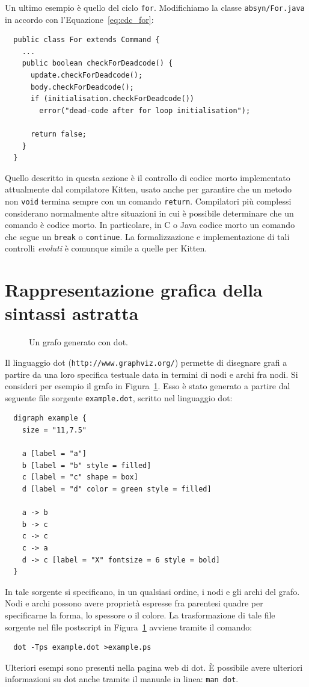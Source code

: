 Un ultimo esempio \`e quello del ciclo \texttt{for}.
Modifichiamo la classe \texttt{absyn/For.java} in accordo
con l'Equazione~\eqref{eq:cdc_for}:
%
\begin{verbatim}
  public class For extends Command {
    ...
    public boolean checkForDeadcode() {
      update.checkForDeadcode();
      body.checkForDeadcode();
      if (initialisation.checkForDeadcode())
        error("dead-code after for loop initialisation");

      return false;
    }
  }
\end{verbatim}
%

Quello descritto in questa sezione \`e il controllo di codice morto
implementato attualmente dal compilatore Kitten, usato anche per garantire che
un metodo non \texttt{void} termina sempre con un comando \texttt{return}.
Compilatori pi\`u complessi considerano normalmente altre situazioni in cui \`e
possibile determinare che un comando \`e codice morto. In particolare, in C o
Java \e codice morto un comando che segue un \texttt{break} o
\texttt{continue}.
La formalizzazione e implementazione di tali controlli \emph{evoluti}
\`e comunque simile a quelle per Kitten.
%
\section{Rappresentazione grafica della sintassi astratta}
  \label{sec:graphical_abstract_syntax}
%
\begin{figure}
\begin{center}
\end{center}
\caption{Un grafo generato con dot.}\label{fig:dot_example}
\end{figure}
%
Il linguaggio dot (\texttt{http://www.graphviz.org/}) permette di
disegnare grafi a partire da una loro specifica testuale data in
termini di nodi e archi fra nodi. Si consideri per esempio il grafo
in Figura~\ref{fig:dot_example}. Esso \`e stato generato a partire dal
seguente file sorgente \texttt{example.dot}, scritto nel linguaggio dot:
%
\begin{verbatim}
  digraph example {
    size = "11,7.5"

    a [label = "a"]
    b [label = "b" style = filled]
    c [label = "c" shape = box]
    d [label = "d" color = green style = filled]

    a -> b
    b -> c
    c -> c
    c -> a
    d -> c [label = "X" fontsize = 6 style = bold]
  }
\end{verbatim}
%
In tale sorgente si specificano, in un qualsiasi ordine, i nodi e
gli archi del grafo. Nodi e archi possono avere propriet\`a espresse fra
parentesi quadre per specificarne la forma, lo spessore o il colore.
La trasformazione di tale file sorgente nel file postscript in
Figura~\ref{fig:dot_example} avviene tramite il comando:
%
\begin{verbatim}
  dot -Tps example.dot >example.ps
\end{verbatim}
%
Ulteriori esempi sono presenti nella pagina web di dot.
\`E possibile avere ulteriori informazioni su dot anche tramite
il manuale in linea: \texttt{man dot}.

